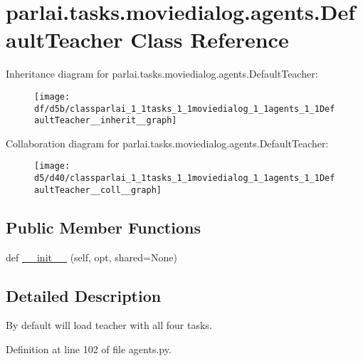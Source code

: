 \hypertarget{classparlai_1_1tasks_1_1moviedialog_1_1agents_1_1DefaultTeacher}{}\section{parlai.\+tasks.\+moviedialog.\+agents.\+Default\+Teacher Class Reference}
\label{classparlai_1_1tasks_1_1moviedialog_1_1agents_1_1DefaultTeacher}


Inheritance diagram for parlai.\+tasks.\+moviedialog.\+agents.\+Default\+Teacher\+:
\nopagebreak
\begin{figure}[H]
\begin{center}
\leavevmode
\texttt{[image: df/d5b/classparlai\_1\_1tasks\_1\_1moviedialog\_1\_1agents\_1\_1DefaultTeacher\_\_inherit\_\_graph]}
\end{center}
\end{figure}


Collaboration diagram for parlai.\+tasks.\+moviedialog.\+agents.\+Default\+Teacher\+:
\nopagebreak
\begin{figure}[H]
\begin{center}
\leavevmode
\texttt{[image: d5/d40/classparlai\_1\_1tasks\_1\_1moviedialog\_1\_1agents\_1\_1DefaultTeacher\_\_coll\_\_graph]}
\end{center}
\end{figure}
\subsection*{Public Member Functions}
\begin{DoxyCompactItemize}
\item 
def \hyperlink{classparlai_1_1tasks_1_1moviedialog_1_1agents_1_1DefaultTeacher_a80e2f5fa10d6a6d884fca5ca97fe2e29}{\+\_\+\+\_\+init\+\_\+\+\_\+} (self, opt, shared=None)
\end{DoxyCompactItemize}


\subsection{Detailed Description}
\begin{DoxyVerb}By default will load teacher with all four tasks.
\end{DoxyVerb}
 

Definition at line 102 of file agents.\+py.



